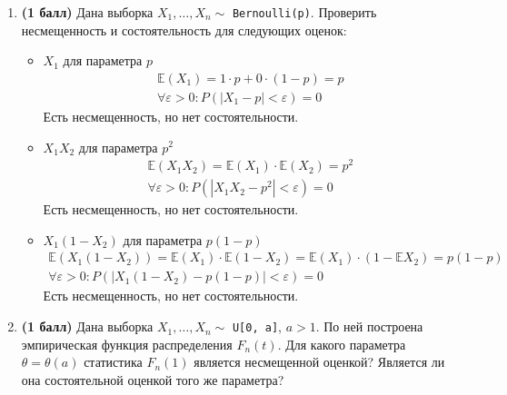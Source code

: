 \documentclass{assignment}
\begin{document}
\begin{enumerate}
    \item \textbf{(1 балл)} Дана выборка $X_1, \ldots, X_n \sim $ \texttt{Bernoulli(p)}. Проверить несмещенность и состоятельность для следующих оценок:
    \begin{itemize}
        \item $X_1$ для параметра $p$
        \start
        \begin{eqnarray}
            \mathbb{E}(X_1) = 1\cdot p + 0 \cdot (1-p) = p \\
            \forall \varepsilon > 0 : P(|X_1 - p| < \varepsilon) = 0
        \end{eqnarray}
        Есть несмещенность, но нет состоятельности.
        \finish
        \item $X_1X_2$ для параметра $p^2$
        \start
        \begin{eqnarray}
            \mathbb{E}(X_1X_2) = \mathbb{E}(X_1) \cdot \mathbb{E}(X_2) = p^2 \\
            \forall \varepsilon > 0 : P(|X_1X_2 - p^2| < \varepsilon) = 0
        \end{eqnarray}
        Есть несмещенность, но нет состоятельности.
        \finish
        \item $X_1(1 - X_2)$ для параметра $p(1 - p)$
        \start
        \begin{eqnarray}
            \mathbb{E}(X_1(1-X_2)) = \mathbb{E}(X_1) \cdot \mathbb{E}(1-X_2) = \mathbb{E}(X_1) \cdot (1-\mathbb{E}X_2) = p(1-p) \\
            \forall \varepsilon > 0 : P(|X_1(1-X_2) - p(1-p)| < \varepsilon) = 0
        \end{eqnarray}
        Есть несмещенность, но нет состоятельности.
        \finish
    \end{itemize}

    \item \textbf{(1 балл)} Дана выборка $X_1, \ldots, X_n \sim $ \texttt{U[0, a]}, $a > 1$. По ней построена эмпирическая функция распределения $F_n(t)$. Для какого параметра $\theta = \theta(a)$ статистика $F_n(1)$ является несмещенной оценкой? Является ли она состоятельной оценкой того же параметра?
\end{enumerate}

\newpage
\end{document}
